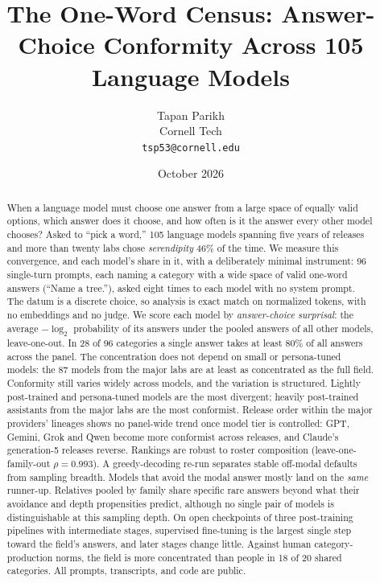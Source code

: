 \documentclass[11pt]{article}
\title{\textbf{The One-Word Census: Answer-Choice Conformity Across 105 Language Models}}
\author{Tapan Parikh\\Cornell Tech\\\texttt{tsp53@cornell.edu}}
\date{October 2026}
\begin{document}
\maketitle

\begin{abstract}
\noindent
When a language model must choose one answer from a large space of equally valid options, which answer does it choose, and how often is it the answer every other model chooses? Asked to ``pick a word,'' 105 language models spanning five years of releases and more than twenty labs chose \emph{serendipity} 46\% of the time. We measure this convergence, and each model's share in it, with a deliberately minimal instrument: 96 single-turn prompts, each naming a category with a wide space of valid one-word answers (``Name a tree.''), asked eight times to each model with no system prompt. The datum is a discrete choice, so analysis is exact match on normalized tokens, with no embeddings and no judge. We score each model by \emph{answer-choice surprisal}: the average $-\log_2$ probability of its answers under the pooled answers of all other models, leave-one-out. In 28 of 96 categories a single answer takes at least 80\% of all answers across the panel. The concentration does not depend on small or persona-tuned models: the 87 models from the major labs are at least as concentrated as the full field. Conformity still varies widely across models, and the variation is structured. Lightly post-trained and persona-tuned models are the most divergent; heavily post-trained assistants from the major labs are the most conformist. Release order within the major providers' lineages shows no panel-wide trend once model tier is controlled: GPT, Gemini, Grok and Qwen become more conformist across releases, and Claude's generation-5 releases reverse. Rankings are robust to roster composition (leave-one-family-out $\rho = 0.993$). A greedy-decoding re-run separates stable off-modal defaults from sampling breadth. Models that avoid the modal answer mostly land on the \emph{same} runner-up. Relatives pooled by family share specific rare answers beyond what their avoidance and depth propensities predict, although no single pair of models is distinguishable at this sampling depth. On open checkpoints of three post-training pipelines with intermediate stages, supervised fine-tuning is the largest single step toward the field's answers, and later stages change little. Against human category-production norms, the field is more concentrated than people in 18 of 20 shared categories. All prompts, transcripts, and code are public.
\end{abstract}
\end{document}
